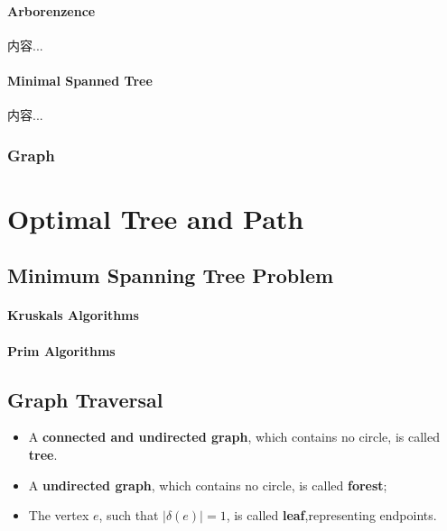 \documentclass[Total.tex]{subfiles}
\begin{document}
				\subsubsection{Arborenzence}
					\begin{Def}
						内容...
					\end{Def}
				\subsubsection{Minimal Spanned Tree}
					\begin{Def}
						内容...
					\end{Def}
			\subsection{Graph }
	\chapter{Optimal Tree and Path}
	
		\section{Minimum Spanning Tree Problem}
		
			\subsubsection{Kruskals Algorithms}
			
			\subsubsection{Prim Algorithms}
	
		\section{Graph Traversal}
		
		\begin{Def}
			\begin{itemize}
				\item A \textbf{connected and undirected graph}, which contains no circle, is called \textbf{tree}. 
				
				\item A \textbf{undirected graph}, which contains no circle, is called \textbf{forest};
				
				\item The vertex $e$, such that $|\delta(e)|=1$, is called \textbf{leaf},representing endpoints.
			\end{itemize}
		\end{Def}
		
\end{document}
